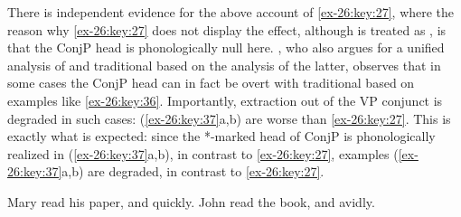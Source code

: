 \documentclass[output=paper]{langsci/langscibook}
\begin{document}
There is independent evidence for the above account of \eqref{ex-26:key:27},
where the reason why \eqref{ex-26:key:27} does not display the
 effect, although  is treated as
, is that the ConjP head is phonologically null here.
\textcite{Progovac1998,Progovac1999}, who also argues for a unified analysis of
 and traditional  based on the
 analysis of the latter, observes that in some cases the
ConjP head can in fact be overt with traditional  based on
examples like \eqref{ex-26:key:36}. Importantly, extraction out of the VP
conjunct is degraded in such cases: (\ref{ex-26:key:37}a,b) are worse than
\eqref{ex-26:key:27}. This is exactly what is expected: since the *-marked head
of ConjP is phonologically realized in (\ref{ex-26:key:37}a,b), in contrast to
\eqref{ex-26:key:27}, examples (\ref{ex-26:key:37}a,b) are degraded, in
contrast to \eqref{ex-26:key:27}.

\ea\label{ex-26:key:36}
	\ea Mary read his paper, and quickly.
	\ex John read the book, and avidly.
	\z
\z

\ea\label{ex-26:key:37}
	\z
\z
\end{document}
